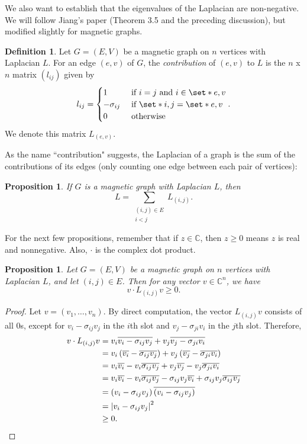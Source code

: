 \documentclass[12pt]{article}
\newtheorem{prop}[thm]{Proposition}
\theoremstyle{definition}
\newtheorem{defn}[thm]{Definition}
\newcommand{\C}{\mathbb C}
\DeclarePairedDelimiter\abs{\lvert}{\rvert}
\begin{document}
We also want to establish that the eigenvalues of the Laplacian are non-negative. We will follow Jiang's paper (Theorem 3.5 and the preceding discussion), but modified slightly for magnetic graphs.

\begin{defn}
Let $G=(E,V)$ be a magnetic graph on $n$ vertices with Laplacian $L$. For an edge $(e, v)$ of $G$, the \textit{contribution} of $(e, v)$ to $L$ is the $n$ x $n$ matrix $(l_{ij})$ given by
$$
l_{ij} =
\begin{cases}
1 &\mbox{ if } i=j \mbox{ and } i \in \set*{e, v} \\
-\sigma_{ij} &\mbox{ if } \set*{i,j} = \set*{e,v} \\
0 &\mbox{ otherwise}
\end{cases}.
$$ 
We denote this matrix $L_{(e, v)}$.
\end{defn}

As the name ``contribution" suggests, the Laplacian of a graph is the sum of the contributions of its edges (only counting one edge between each pair of vertices):

\begin{prop}
If $G$ is a magnetic graph with Laplacian $L$, then 
$$
L = \sum_{\substack{(i, j) \in E \\ i < j}} L_{(i, j)}.
$$
\end{prop}

For the next few propositions, remember that if $z \in \C$, then $z \geq 0$ means $z$ is real and nonnegative. Also, $\cdot$ is the complex dot product.

\begin{prop}\label{contributions to Laplacian are positive semi-definite}
Let $G=(E, V)$ be a magnetic graph on $n$ vertices with Laplacian $L$, and let $(i, j) \in E$. Then for any vector $v \in \C^n$, we have 
$$v \cdot L_{(i,j)} v \geq 0.$$
\end{prop}
\begin{proof}
Let $v = (v_1, \dots, v_n)$. By direct computation, the vector $L_{(i,j)}v$ consists of all 0s, except for $v_i-\sigma_{ij}v_j$ in the $i$th slot and $v_j-\sigma_{ji}v_i$ in the $j$th slot. Therefore,
\begin{align*}
v \cdot L_{(i,j)} v &= v_i \overline{v_i-\sigma_{ij}v_j} + v_j \overline{v_j-\sigma_{ji}v_i} \\
&= v_i \left(\overline{v_i} - \overline{\sigma_{ij}}\overline{v_j}\right) + v_j \left(\overline{v_j} - \overline{\sigma_{ji}}\overline{v_i}\right) \\
&= v_i \overline{v_i} - v_i \overline{\sigma_{ij}}\overline{v_j} + v_j \overline{v_j} - v_j \overline{\sigma_{ji}}\overline{v_i} \\
&= v_i \overline{v_i} - v_i \overline{\sigma_{ij}}\overline{v_j} - \sigma_{ij}v_j \overline{v_i} + \sigma_{ij} v_j \overline{\sigma_{ij} v_j} \\
&= \left( v_i - \sigma_{ij} v_j \right) \overline{ \left( v_i - \sigma_{ij} v_j \right) } \\
&= \abs*{v_i - \sigma_{ij} v_j}^2 \\
&\geq 0.
\end{align*}
\end{proof}
\end{document}
